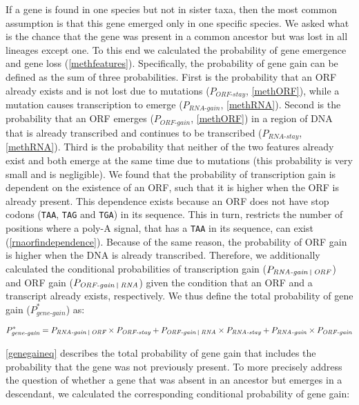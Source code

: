 \documentclass[12pt,a4paper]{article}
\begin{document}
If a gene is found in one species but not in sister taxa, then the most common assumption is that this gene emerged only in one specific species. We asked what is the chance that the gene was present in a common ancestor but was lost in all lineages except one. To this end we calculated the probability of gene emergence and gene loss (\autoref{methfeatures}). Specifically, the probability of gene gain can be defined as the sum of three probabilities. First is the probability that an ORF already exists and is not lost due to mutations ($P_\textit{ORF-stay}$, \autoref{methORF}), while a mutation causes transcription to emerge ($P_\textit{RNA-gain}$, \autoref{methRNA}). Second is the probability that an ORF emerges ($P_\textit{ORF-gain}$, \autoref{methORF}) in a region of DNA that is already transcribed and continues to be transcribed ($P_\textit{RNA-stay}$, \autoref{methRNA}). Third is the probability that neither of the two features already exist and both emerge at the same time due to mutations (this probability is very small and is negligible). We found that the probability of transcription gain is dependent on the existence of an ORF, such that it is higher when the ORF is already present. This dependence exists because an ORF does not have stop codons (\texttt{TAA}, \texttt{TAG} and \texttt{TGA}) in its sequence. This in turn, restricts the number of positions where a poly-A signal, that has a \texttt{TAA} in its sequence, can exist (\autoref{rnaorfindependence}). Because of the same reason, the probability of ORF gain is higher when the DNA is already transcribed. Therefore, we additionally calculated the conditional probabilities of transcription gain ($P_\textit{RNA-gain \vline\ ORF}$) and ORF gain ($P_\textit{ORF-gain \vline\ RNA}$) given the condition that an ORF and a transcript already exists, respectively. We thus define the total probability of gene gain ($P_\textit{gene-gain}^*$) as:

\begin{equation}
P_\textit{gene-gain}^* = P_\textit{RNA-gain \vline\ ORF} \times P_\textit{ORF-stay} + P_\textit{ORF-gain \vline\ RNA} \times P_\textit{RNA-stay} + P_\textit{RNA-gain}\times P_\textit{ORF-gain}
\label{genegaineq}
\end{equation}

\autoref{genegaineq} describes the total probability of gene gain that includes the probability that the gene was not previously present. To more precisely address the question of whether a gene that was absent in an ancestor but emerges in a descendant, we calculated the corresponding conditional probability of gene gain:
\end{document}
